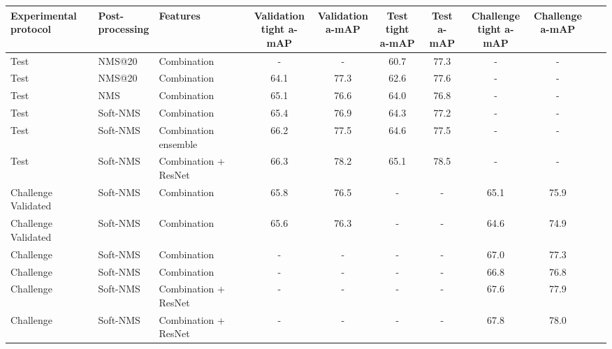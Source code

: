 \documentclass[10pt,twocolumn,letterpaper]{article}
\begin{document}
\begin{table*}
\footnotesize
\centering
  \begin{tabular}{lllcccccccc}
    \toprule
     \makecell[l]{Experimental\\protocol} & 
    \makecell[l]{Post-\\processing} & Features & 
    \makecell{Validation\\tight a-mAP} & \makecell{Validation\\a-mAP} & 
    \makecell{Test tight\\a-mAP} & \makecell{Test\\a-mAP}& 
    \makecell{Challenge\\tight a-mAP} & \makecell{Challenge\\a-mAP}\\
\midrule[2\arrayrulewidth]
    Test & NMS@20 & Combination & - & - & 60.7 & 77.3 & - & -\\
    \hline
    Test & NMS@20 & Combination & 64.1 & 77.3 & 62.6 & 77.6 & - & -\\
    \hline
    Test & NMS & Combination & 65.1 & 76.6 & 64.0 & 76.8 & - & -\\
    \hline
    Test & Soft-NMS & Combination & 65.4 & 76.9 & 64.3 & 77.2 & - & -\\
    \hline
    Test & Soft-NMS & Combination ensemble & 66.2 & 77.5 & 64.6 & 77.5 & - & -\\
    \hline
    Test & Soft-NMS & Combination + ResNet & 66.3 & 78.2 & 65.1 & 78.5 & - & -\\
    \hline
    Challenge Validated & Soft-NMS & Combination & 65.8 & 76.5 & - & - & 65.1 & 75.9\\
    Challenge Validated & Soft-NMS & Combination & 65.6 & 76.3 & - & - & 64.6 & 74.9\\
    \hline
    Challenge & Soft-NMS & Combination & - & - & - & - & 67.0 & 77.3\\
    Challenge & Soft-NMS & Combination & - & - & - & - & 66.8 & 76.8\\
    \hline
    Challenge & Soft-NMS & Combination + ResNet & - & - & - & - & 67.6 & 77.9\\
    Challenge & Soft-NMS & Combination + ResNet & - & - & - & - & 67.8 & 78.0\\
    \bottomrule
  \end{tabular}

\end{table*}
\end{document}
